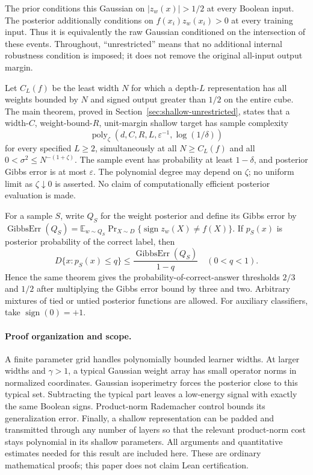 \documentclass[11pt]{article}
\newcommand{\poly}{\operatorname{poly}}
\begin{document}
The prior conditions this Gaussian on $|z_w(x)|>1/2$ at every Boolean
input. The posterior additionally conditions on
$f(x_i)z_w(x_i)>0$ at every training input. Thus it is equivalently the
raw Gaussian conditioned on the intersection of these events. Throughout,
``unrestricted'' means that no additional internal robustness condition
is imposed; it does not remove the original all-input output margin.

Let $C_L(f)$ be the least width $N$ for which a depth-$L$ representation
has all weights bounded by $N$ and signed output greater than $1/2$
on the entire cube. The main theorem, proved in
Section~\ref{sec:shallow-unrestricted}, states that a width-$C$,
weight-bound-$R$, unit-margin shallow target has sample complexity
\[
 \poly_\zeta(d,C,R,L,\varepsilon^{-1},\log(1/\delta))
\]
for every specified $L\ge2$, simultaneously at all $N\ge C_L(f)$ and
all $0<\sigma^2\le N^{-(1+\zeta)}$. The sample event has probability
at least $1-\delta$, and posterior Gibbs error is at most $\varepsilon$.
The polynomial degree may depend on $\zeta$; no uniform limit as
$\zeta\downarrow0$ is asserted. No claim of computationally efficient
posterior evaluation is made.

For a sample $S$, write $Q_S$ for the weight posterior and define its
Gibbs error by
$\operatorname{GibbsErr}(Q_S)=\mathbb E_{w\sim Q_S}
\Pr_{X\sim D}\{\operatorname{sign}z_w(X)\ne f(X)\}$.
If $p_S(x)$ is posterior probability of the correct label, then
\[
 D\{x:p_S(x)\le q\}
 \le\frac{\operatorname{GibbsErr}(Q_S)}{1-q}\quad(0<q<1).
\]
Hence the same theorem gives the probability-of-correct-answer thresholds
$2/3$ and $1/2$ after multiplying the Gibbs error bound by three and two.
Arbitrary mixtures of tied or untied posterior functions are allowed.
For auxiliary classifiers, take $\operatorname{sign}(0)=+1$.

\paragraph{Proof organization and scope.}
A finite parameter grid handles polynomially bounded learner widths.
At larger widths and $\gamma>1$, a typical Gaussian weight array has small
operator norms in normalized coordinates. Gaussian isoperimetry forces the
posterior close to this typical set. Subtracting the typical part leaves a
low-energy signal with exactly the same Boolean signs. Product-norm
Rademacher control bounds its generalization error. Finally, a shallow
representation can be padded and transmitted through any number of layers
so that the relevant product-norm cost stays polynomial in its shallow
parameters. All arguments and quantitative estimates needed for this
result are included here. These are ordinary mathematical proofs; this
paper does not claim Lean certification.
\end{document}
